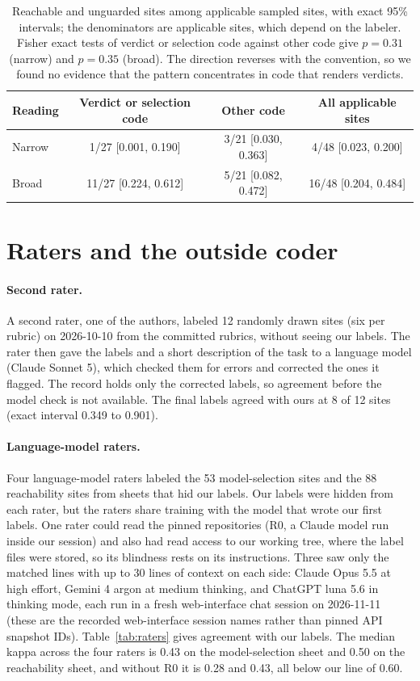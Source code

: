 \documentclass[10pt]{article}
\theoremstyle{definition}
\begin{document}
\begin{table}[h]
\centering\footnotesize
\begin{tabular}{@{}lccc@{}}
\toprule
Reading & Verdict or selection code & Other code & All applicable sites\\
\midrule
Narrow & 1/27 [0.001, 0.190] & 3/21 [0.030, 0.363] & 4/48 [0.023, 0.200]\\
Broad & 11/27 [0.224, 0.612] & 5/21 [0.082, 0.472] & 16/48 [0.204, 0.484]\\
\bottomrule
\end{tabular}
\caption{Reachable and unguarded sites among applicable sampled sites, with exact 95\% intervals; the denominators are applicable sites, which depend on the labeler. Fisher exact tests of verdict or selection code against other code give $p=0.31$ (narrow) and $p=0.35$ (broad). The direction reverses with the convention, so we found no evidence that the pattern concentrates in code that renders verdicts.}
\label{tab:external}
\end{table}

\section{Raters and the outside coder}
\label{apd:raters}

\paragraph{Second rater.} A second rater, one of the authors, labeled 12 randomly drawn sites (six per rubric) on 2026-10-10 from the committed rubrics, without seeing our labels. The rater then gave the labels and a short description of the task to a language model (Claude Sonnet 5), which checked them for errors and corrected the ones it flagged. The record holds only the corrected labels, so agreement before the model check is not available. The final labels agreed with ours at 8 of 12 sites (exact interval 0.349 to 0.901).

\paragraph{Language-model raters.} Four language-model raters labeled the 53 model-selection sites and the 88 reachability sites from sheets that hid our labels. Our labels were hidden from each rater, but the raters share training with the model that wrote our first labels. One rater could read the pinned repositories (R0, a Claude model run inside our session) and also had read access to our working tree, where the label files were stored, so its blindness rests on its instructions. Three saw only the matched lines with up to 30 lines of context on each side: Claude Opus 5.5 at high effort, Gemini 4 argon at medium thinking, and ChatGPT luna 5.6 in thinking mode, each run in a fresh web-interface chat session on 2026-11-11 (these are the recorded web-interface session names rather than pinned API snapshot IDs). Table~\ref{tab:raters} gives agreement with our labels. The median kappa across the four raters is 0.43 on the model-selection sheet and 0.50 on the reachability sheet, and without R0 it is 0.28 and 0.43, all below our line of 0.60.
\end{document}
